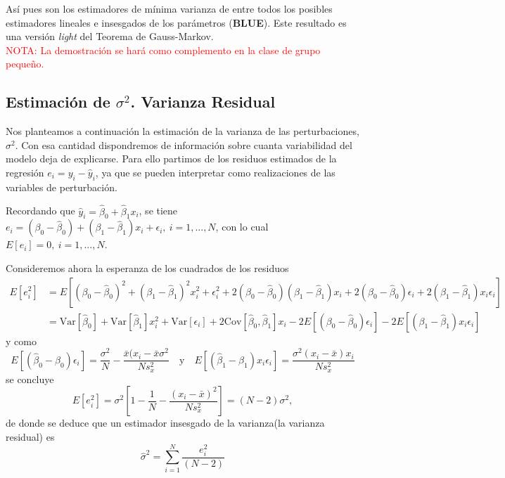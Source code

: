 \documentclass[10pt,a4paper]{book}
\begin{document}
Así pues son los estimadores de mínima varianza de entre todos los posibles estimadores lineales e
insesgados de los parámetros (\textbf{BLUE}). Este resultado es una versión \textit{light} del Teorema de Gauss-Markov.
\ \\

\textcolor{red}{NOTA: La demostración se hará como complemento en la clase de grupo pequeño.}
		\subsection{Estimación de $\sigma^2$. Varianza Residual}
Nos planteamos a continuación la estimación de la varianza de las perturbaciones, $\sigma^2$. Con esa cantidad dispondremos de información sobre cuanta variabilidad del modelo deja de explicarse. Para ello partimos de los residuos estimados de la regresión $e_i=y_i-\widehat{y}_i$, ya que se pueden interpretar como realizaciones de las variables de perturbación.

Recordando que $\widehat{y}_i=\widehat{\beta}_0+\widehat{\beta}_1x_i$, se tiene $e_i=(\beta_0-\widehat{\beta}_0)+(\beta_1-\widehat{\beta}_1)x_i+\epsilon_i,\ i=1,...,N$, con lo cual $E[e_i]=0,\ i=1,...,N$.

Consideremos ahora la esperanza de los cuadrados de los residuos
\begin{equation*}
\begin{split}
E[e^2_i]&=E\left[(\beta_0-\widehat{\beta}_0)^2+(\beta_1-\widehat{\beta}_1)^2x^2_i+\epsilon^2_i+2(\beta_0-\widehat{\beta}_0)(\beta_1-\widehat{\beta}_1)x_i+2(\beta_0-\widehat{\beta}_0)\epsilon_i+2(\beta_1-\widehat{\beta}_1)x_i\epsilon_i\right]\\
&=\mathrm{Var}[\widehat{\beta}_0]+\mathrm{Var}[\widehat{\beta}_1]x^2_i+\mathrm{Var}[\epsilon_i]+2\mathrm{Cov}[\widehat{\beta}_0,\widehat{\beta}_1]x_i-2E[(\beta_0-\widehat{\beta}_0)\epsilon_i]-2E[(\beta_1-\widehat{\beta}_1)x_i\epsilon_i]
\end{split}
\end{equation*}
y como $$E[(\widehat{\beta}_0-\beta_0)\epsilon_i]=\dfrac{\sigma^2}{N}-\dfrac{\bar{x}(x_i-\bar{x}\sigma^2}{Ns^2_x}\quad \mathrm{y} \quad E[(\widehat{\beta}_1-\beta_1)x_i\epsilon_i]=\dfrac{\sigma^2(x_i-\bar{x})x_i}{Ns^2_x}$$ se concluye $$E[e^2_i]=\sigma^2\left[1-\dfrac{1}{N}-\dfrac{(x_i-\bar{x})^2}{Ns^2_x}\right]=(N-2)\sigma^2,$$ de donde se deduce que un estimador insesgado de la varianza(la varianza residual) es $$\widehat{\sigma}^2=\sum^N_{i=1}\frac{e^2_i}{(N-2)}$$
\ \\
\end{document}
